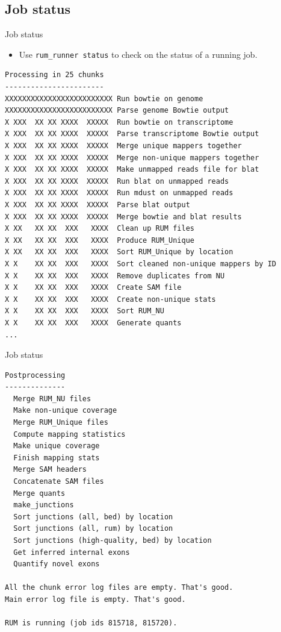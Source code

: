 \documentclass{beamer}
\begin{document}
\subsection{Job status}

\begin{frame}[fragile]{Job status}
  \begin{itemize}
  \item Use \texttt{rum\_runner status} to check on the status of a
    running job.
  \end{itemize}
  \tiny
\begin{verbatim}
Processing in 25 chunks
-----------------------
XXXXXXXXXXXXXXXXXXXXXXXXX Run bowtie on genome
XXXXXXXXXXXXXXXXXXXXXXXXX Parse genome Bowtie output
X XXX  XX XX XXXX  XXXXX  Run bowtie on transcriptome
X XXX  XX XX XXXX  XXXXX  Parse transcriptome Bowtie output
X XXX  XX XX XXXX  XXXXX  Merge unique mappers together
X XXX  XX XX XXXX  XXXXX  Merge non-unique mappers together
X XXX  XX XX XXXX  XXXXX  Make unmapped reads file for blat
X XXX  XX XX XXXX  XXXXX  Run blat on unmapped reads
X XXX  XX XX XXXX  XXXXX  Run mdust on unmapped reads
X XXX  XX XX XXXX  XXXXX  Parse blat output
X XXX  XX XX XXXX  XXXXX  Merge bowtie and blat results
X XX   XX XX  XXX   XXXX  Clean up RUM files
X XX   XX XX  XXX   XXXX  Produce RUM_Unique
X XX   XX XX  XXX   XXXX  Sort RUM_Unique by location
X X    XX XX  XXX   XXXX  Sort cleaned non-unique mappers by ID
X X    XX XX  XXX   XXXX  Remove duplicates from NU
X X    XX XX  XXX   XXXX  Create SAM file
X X    XX XX  XXX   XXXX  Create non-unique stats
X X    XX XX  XXX   XXXX  Sort RUM_NU
X X    XX XX  XXX   XXXX  Generate quants
...
\end{verbatim}
\end{frame}

\begin{frame}[fragile]{Job status}
\tiny
\begin{verbatim}
Postprocessing
--------------
  Merge RUM_NU files
  Make non-unique coverage
  Merge RUM_Unique files
  Compute mapping statistics
  Make unique coverage
  Finish mapping stats
  Merge SAM headers
  Concatenate SAM files
  Merge quants
  make_junctions
  Sort junctions (all, bed) by location
  Sort junctions (all, rum) by location
  Sort junctions (high-quality, bed) by location
  Get inferred internal exons
  Quantify novel exons

All the chunk error log files are empty. That's good.
Main error log file is empty. That's good.

RUM is running (job ids 815718, 815720).
\end{verbatim}
\end{frame}
\end{document}
